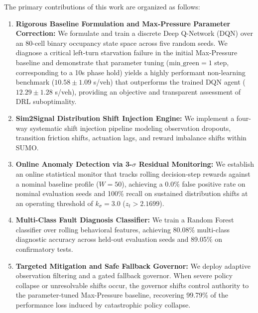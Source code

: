 \documentclass{ieeeaccess}
\begin{document}
The primary contributions of this work are organized as follows:
\begin{enumerate}
    \item \textbf{Rigorous Baseline Formulation and Max-Pressure Parameter Correction:} We formulate and train a discrete Deep Q-Network (DQN) over an 80-cell binary occupancy state space across five random seeds. We diagnose a critical left-turn starvation failure in the initial Max-Pressure baseline and demonstrate that parameter tuning ($\text{min\_green}=1$ step, corresponding to a 10s phase hold) yields a highly performant non-learning benchmark ($10.58 \pm 1.09$ s/veh) that outperforms the trained DQN agent ($12.29 \pm 1.28$ s/veh), providing an objective and transparent assessment of DRL suboptimality.
    \item \textbf{Sim2Signal Distribution Shift Injection Engine:} We implement a four-way systematic shift injection pipeline modeling observation dropouts, transition friction shifts, actuation lags, and reward imbalance shifts within SUMO.
    \item \textbf{Online Anomaly Detection via 3-$\sigma$ Residual Monitoring:} We establish an online statistical monitor that tracks rolling decision-step rewards against a nominal baseline profile ($W=50$), achieving a 0.0\% false positive rate on nominal evaluation seeds and 100\% recall on sustained distribution shifts at an operating threshold of $k_\sigma = 3.0$ ($z_t > 2.1699$).
    \item \textbf{Multi-Class Fault Diagnosis Classifier:} We train a Random Forest classifier over rolling behavioral features, achieving 80.08\% multi-class diagnostic accuracy across held-out evaluation seeds and 89.05\% on confirmatory tests.
    \item \textbf{Targeted Mitigation and Safe Fallback Governor:} We deploy adaptive observation filtering and a gated fallback governor. When severe policy collapse or unresolvable shifts occur, the governor shifts control authority to the parameter-tuned Max-Pressure baseline, recovering 99.79\% of the performance loss induced by catastrophic policy collapse.
\end{enumerate}
\end{document}
